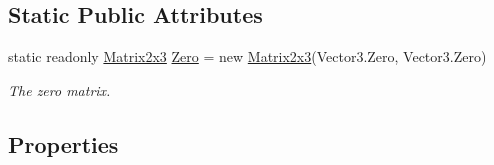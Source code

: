 \subsection*{Static Public Attributes}
\begin{DoxyCompactItemize}
\item 
static readonly \hyperlink{struct_open_t_k_1_1_matrix2x3}{Matrix2x3} \hyperlink{struct_open_t_k_1_1_matrix2x3_aff6a7521b992e7be7caa844f5c81c2ef}{Zero} = new \hyperlink{struct_open_t_k_1_1_matrix2x3}{Matrix2x3}(Vector3.\-Zero, Vector3.\-Zero)
\begin{DoxyCompactList}\small\item\em The zero matrix. \end{DoxyCompactList}\end{DoxyCompactItemize}
\subsection*{Properties}
